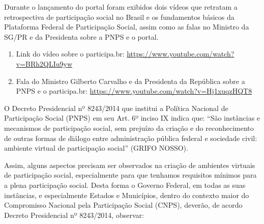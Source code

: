 \documentclass{article}
\begin{document}
Durante o lançamento do portal foram exibidos dois vídeos que retratam a
retrospectiva de participação social no Brasil e os fundamentos básicos da
Plataforma Federal de Participação Social, assim como as falas no Ministro da
SG/PR e da Presidenta sobre a PNPS e o portal.

\begin{enumerate}
  \item Link do vídeo sobre o participa.br: \url{https://www.youtube.com/watch?v=BRh2QLIu9yw}
  \item Fala do Ministro Gilberto Carvalho e da Presidenta da República sobre a PNPS e o participa.br: \url{https://www.youtube.com/watch?v=Hj1xuqzHQT8}
\end{enumerate}

O Decreto Presidencial nº 8243/2014 que institui a Política Nacional de
Participação Social (PNPS) em seu Art. 6º inciso IX indica que: ``São instâncias
e mecanismos de participação social, sem prejuízo da criação e do
reconhecimento de outras formas de diálogo entre administração pública federal
e sociedade civil: ambiente virtual de participação social'' (GRIFO NOSSO).

Assim, alguns aspectos precisam ser observados na criação de ambientes virtuais
de participação social, especialmente para que tenhamos requisitos mínimos para
a plena participação social. Desta forma o Governo Federal, em todas as suas
instâncias, e especialmente Estados e Municípios, dentro do contexto maior do
Compromisso Nacional pela Participação Social (CNPS), deverão, de acordo
Decreto Presidencial nº 8243/2014, observar:
\end{document}
